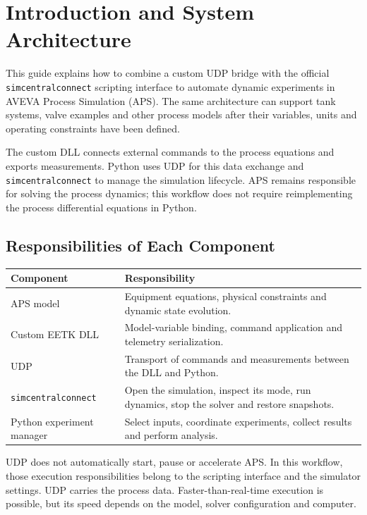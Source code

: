 \documentclass[11pt, letterpaper]{article}
\begin{document}
\section{Introduction and System Architecture}
This guide explains how to combine a custom UDP bridge with the official \texttt{simcentralconnect} scripting interface to automate dynamic experiments in AVEVA Process Simulation (APS). The same architecture can support tank systems, valve examples and other process models after their variables, units and operating constraints have been defined.

The custom DLL connects external commands to the process equations and exports measurements. Python uses UDP for this data exchange and \texttt{simcentralconnect} to manage the simulation lifecycle. APS remains responsible for solving the process dynamics; this workflow does not require reimplementing the process differential equations in Python.

\subsection{Responsibilities of Each Component}
\begin{tabularx}{\textwidth}{l X}
\toprule
\textbf{Component} & \textbf{Responsibility} \\
\midrule
APS model & Equipment equations, physical constraints and dynamic state evolution. \\
Custom EETK DLL & Model-variable binding, command application and telemetry serialization. \\
UDP & Transport of commands and measurements between the DLL and Python. \\
\texttt{simcentralconnect} & Open the simulation, inspect its mode, run dynamics, stop the solver and restore snapshots. \\
Python experiment manager & Select inputs, coordinate experiments, collect results and perform analysis. \\
\bottomrule
\end{tabularx}

\begin{notebox}
UDP does not automatically start, pause or accelerate APS. In this workflow, those execution responsibilities belong to the scripting interface and the simulator settings. UDP carries the process data. Faster-than-real-time execution is possible, but its speed depends on the model, solver configuration and computer.
\end{notebox}
\end{document}
